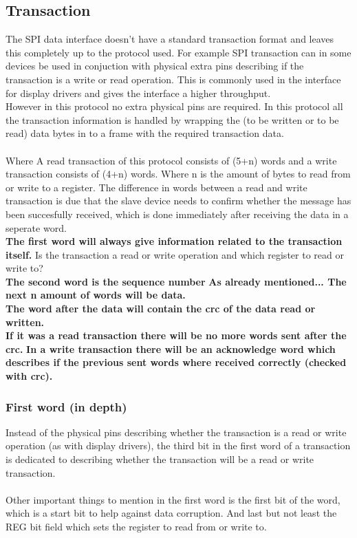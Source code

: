 \documentclass{article}
\begin{document}
\subsection{Transaction}
The SPI data interface doesn't have a standard transaction format and leaves this completely up to the protocol used. For example SPI transaction can in some devices be used in conjuction with physical extra pins describing if the transaction is a write or read operation. This is commonly used in the interface for display drivers and gives the interface a higher throughput.
\\
However in this protocol no extra physical pins are required. In this protocol all the transaction information is handled by wrapping the  (to be written or to be read) data bytes in to a frame with the required transaction data.\\\\
Where A read transaction of this protocol consists of (5+n) words and a write transaction consists of (4+n) words. Where n is the amount of bytes to read from or write to a register. The difference in words between a read and write transaction is due that the slave device needs to confirm whether the message has been succesfully received, which is done immediately after receiving the data in a seperate word.
\pagebreak\\
\textbf{The first word will always give information related to the transaction itself.} Is the transaction a read or write operation and which register to read or write to?  \\
\textbf{The second word is the sequence number}
\textbf{As already mentioned... The next n amount of words will be data.}\\
\textbf{The word after the data will contain the crc of the data read or written.}\\
\textbf{If it was a read transaction there will be no more words sent after the crc.}
\textbf{In a write transaction there will be an acknowledge word which describes if the previous sent words where received correctly (checked with crc).}
\subsubsection{First word (in depth)}

Instead of the physical pins describing whether the transaction is a read or write operation (as with display drivers), the third bit in the first word of a transaction is dedicated to describing whether the transaction will be a read or write transaction.
\\\\
Other important things to mention in the first word is the first bit of the word, which is a start bit to help against data corruption. And last but not least the REG bit field which sets the register to read from or write to.
\end{document}
